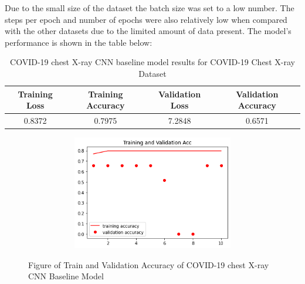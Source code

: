     \begin{table}[H]
    \centering
    \caption{COVID-19 chest X-ray CNN baseline model hyperparameters for COVID-19 Chest X-ray Dataset }
    \label{tab:COVID-19 chest X-ray CNN baseline model hyperparameters}
\end{table}
Due to the small size of the dataset the batch size was set to a low number. The steps per epoch and number of epochs were also relatively low when compared with the other datasets due to the limited amount of data present.  The model's performance is shown in the table below:
\begin{table}[H]
    \centering
    \begin{tabular}{|c|c|c|c|}
    \hline
         Training Loss
         & Training Accuracy 
         & Validation Loss
         & Validation Accuracy\\
         \hline
         0.8372  & 0.7975 & 7.2848 & 0.6571\\
         \hline
    \end{tabular}
    \caption{COVID-19 chest X-ray CNN baseline model results for COVID-19 Chest X-ray Dataset}
    \label{tab:COVID-19 chest X-ray CNN baseline model results}
\end{table}
 \begin{figure}[H]
    \centering
    \includegraphics[width=1\textwidth,height=5cm,keepaspectratio]{Images/ChestXrayCNNBaselineTrainAndValAcc.png}\\
    \caption{Figure of Train and Validation Accuracy of COVID-19 chest X-ray CNN Baseline Model}
    \label{fig:COVID-19 chest X-ray CNN Baseline Train and Validation Accuracy}
\end{figure}
